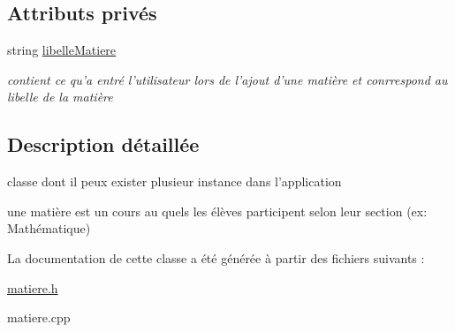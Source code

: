 \subsection*{Attributs privés}
\begin{DoxyCompactItemize}
\item 
\hypertarget{class_matiere_a480270db0295385a1bee7c97918c47c9}{string \hyperlink{class_matiere_a480270db0295385a1bee7c97918c47c9}{libelle\+Matiere}}\label{class_matiere_a480270db0295385a1bee7c97918c47c9}

\begin{DoxyCompactList}\small\item\em contient ce qu'a entré l'utilisateur lors de l'ajout d'une matière et conrrespond au libelle de la matière \end{DoxyCompactList}\end{DoxyCompactItemize}


\subsection{Description détaillée}
classe dont il peux exister plusieur instance dans l'application 

une matière est un cours au quels les élèves participent selon leur section (ex\+: Mathématique) 

La documentation de cette classe a été générée à partir des fichiers suivants \+:\begin{DoxyCompactItemize}
\item 
\hyperlink{matiere_8h}{matiere.\+h}\item 
matiere.\+cpp\end{DoxyCompactItemize}

